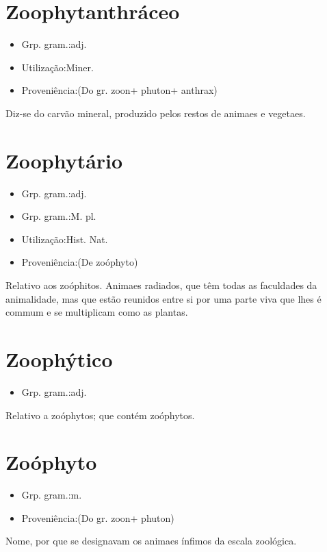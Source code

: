 \section{Zoophytanthráceo}
\begin{itemize}
\item {Grp. gram.:adj.}
\end{itemize}
\begin{itemize}
\item {Utilização:Miner.}
\end{itemize}
\begin{itemize}
\item {Proveniência:(Do gr. \textunderscore zoon\textunderscore  + \textunderscore phuton\textunderscore  + \textunderscore anthrax\textunderscore )}
\end{itemize}
Diz-se do carvão mineral, produzido pelos restos de animaes e vegetaes.
\section{Zoophytário}
\begin{itemize}
\item {Grp. gram.:adj.}
\end{itemize}
\begin{itemize}
\item {Grp. gram.:M. pl.}
\end{itemize}
\begin{itemize}
\item {Utilização:Hist. Nat.}
\end{itemize}
\begin{itemize}
\item {Proveniência:(De \textunderscore zoóphyto\textunderscore )}
\end{itemize}
Relativo aos zoóphitos.
Animaes radiados, que têm todas as faculdades da animalidade, mas que estão reunidos entre si por uma parte viva que lhes é commum e se multiplicam como as plantas.
\section{Zoophýtico}
\begin{itemize}
\item {Grp. gram.:adj.}
\end{itemize}
Relativo a zoóphytos; que contém zoóphytos.
\section{Zoóphyto}
\begin{itemize}
\item {Grp. gram.:m.}
\end{itemize}
\begin{itemize}
\item {Proveniência:(Do gr. \textunderscore zoon\textunderscore  + \textunderscore phuton\textunderscore )}
\end{itemize}
Nome, por que se designavam os animaes ínfimos da escala zoológica.
